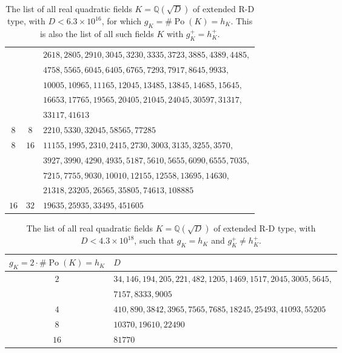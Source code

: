 \documentclass[12pt]{amsart}
\theoremstyle{definition}
\numberwithin{equation}{section}
\DeclareMathOperator{\Po}{Po}
\begin{document}
{\begin{table}[!h]
\begin{center}
\begin{tabular}{|c|c|p{9.2cm}|}
			& & $ 2618, 2805, 2910, 3045, 3230, 3335, 3723, 3885, 4389, 4485,$ \\
			& & $4758, 5565, 6045, 6405, 6765, 7293, 7917, 8645, 9933, $ \\
			& & $10005,10965, 11165, 12045, 13485, 13845, 14685, 15645, $ \\
			& & $16653, 17765,19565, 20405, 21045, 24045, 30597, 31317,$ \\
			& & $33117, 41613$ \\
			\hline 
			$8$ & $8$ & $2210, 5330, 32045, 58565, 77285$ \\ \hline 
			\multirow{4}{0.6em}{$8$}& 	\multirow{4}{0.6em}{$16$} & $11155, 1995, 2310, 2415, 2730, 3003, 3135, 3255, 3570,$ \\
			& & $3927, 3990, 4290, 4935, 5187, 5610, 5655, 6090, 6555, 7035,$ \\ 
			& & $7215, 7755, 9030, 10010, 12155, 12558, 13695, 14630,  $ \\
			& & $21318,23205, 26565, 35805, 74613, 108885$ \\ \hline 
			$16$ & $32$ & $19635, 25935, 33495, 451605$ \\
			\hline
		\end{tabular} \caption{The list of all  real quadratic fields $K=\mathbb{Q}(\sqrt{D})$ of extended R-D type, with  $D < 6.3 \times 10^{16}$, for which $g_K=\#\Po(K)=h_K$.
			This is  also the list of all such fields $K$ with $g_K^+=h_K^+$.} \label{tab,E.R-D}
	\end{center}
\end{table}








	\begin{table}[!h]
	\begin{center}
		\begin{tabular}{|c|p{10.4cm}|} 
			\hline
			$g_K=2\cdot\# \Po(K)=h_K$ & $D$   \\ [0.5ex] 
			\hline \hline
				\multirow{2}{0.5em}{$2$} & $34, 146, 194, 205, 221, 482, 1205, 1469, 1517, 2045, 3005, 5645,$ \\ 
				& $7157, 8333, 9005$ \\ 
			\hline 
			$4$ & $410, 890, 3842, 3965, 7565, 7685, 18245, 25493, 41093, 55205$ \\
			\hline
			$8$ & $10370, 19610, 22490$ \\
			\hline
			$16$ & $81770$ \\
			\hline
		\end{tabular} \caption{The list of all real quadratic fields $K=\mathbb{Q}(\sqrt{D})$ of extended R-D type, with $D < 4.3 \times 10^{18}$, such that $g_K=h_K$ and $g_K^+ \neq h_K^+$.
		 } \label{tab,E.R-D2}
	\end{center}
\end{table}
}
\end{document}
